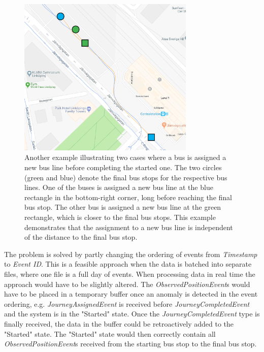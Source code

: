 \begin{figure}[t!]
    \centering
    \includegraphics[width=0.75\textwidth]{figures/assigned_completed_problem}
    \caption{Another example illustrating two cases where a bus is assigned a new bus line before completing the started one.
    The two circles (green and blue) denote the final bus stops for the respective bus lines.
    One of the buses is assigned a new bus line at the blue rectangle in the bottom-right corner, long before reaching the final bus stop.
    The other bus is assigned a new bus line at the green rectangle, which is closer to the final bus stops.
    This example demonstrates that the assignment to a new bus line is independent of the distance to the final bus stop.}
    \label{fig:assigned-before-completed}
\end{figure}

The problem is solved by partly changing the ordering of events from \textit{Timestamp} to \textit{Event ID}.
This is a feasible approach when the data is batched into separate files, where one file is a full day of events.
When processing data in real time the approach would have to be slightly altered.
The \textit{ObservedPositionEvent}s would have to be placed in a temporary buffer once an anomaly is detected in the event ordering, e.g. \textit{JourneyAssignedEvent} is received before \textit{JourneyCompletedEvent} and the system is in the "Started" state.
Once the \textit{JourneyCompletedEvent} type is finally received, the data in the buffer could be retroactively added to the "Started" state.
The "Started" state would then correctly contain all \textit{ObservedPositionEvent}s received from the starting bus stop to the final bus stop.

